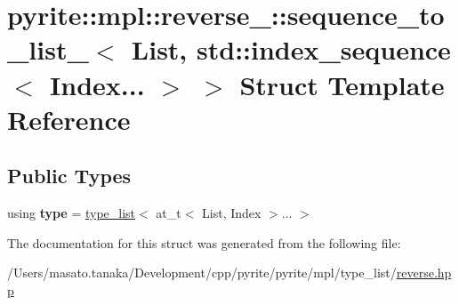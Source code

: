 \hypertarget{structpyrite_1_1mpl_1_1reverse___1_1sequence__to__list___3_01_list_00_01std_1_1index__sequence_3_01_index_8_8_8_01_4_01_4}{}\section{pyrite\+:\+:mpl\+:\+:reverse\+\_\+\+:\+:sequence\+\_\+to\+\_\+list\+\_\+$<$ List, std\+:\+:index\+\_\+sequence$<$ Index... $>$ $>$ Struct Template Reference}
\label{structpyrite_1_1mpl_1_1reverse___1_1sequence__to__list___3_01_list_00_01std_1_1index__sequence_3_01_index_8_8_8_01_4_01_4}
\subsection*{Public Types}
\begin{DoxyCompactItemize}
\item 
\mbox{\label{structpyrite_1_1mpl_1_1reverse___1_1sequence__to__list___3_01_list_00_01std_1_1index__sequence_3_01_index_8_8_8_01_4_01_4_a1340c46dbbd09b4ac3e958df00bf7bf6}} 
using {\bfseries type} = \mbox{\hyperlink{structpyrite_1_1core_1_1mpl_1_1type__list}{type\+\_\+list}}$<$ at\+\_\+t$<$ List, Index $>$... $>$
\end{DoxyCompactItemize}


The documentation for this struct was generated from the following file\+:\begin{DoxyCompactItemize}
\item 
/\+Users/masato.\+tanaka/\+Development/cpp/pyrite/pyrite/mpl/type\+\_\+list/\mbox{\hyperlink{reverse_8hpp}{reverse.\+hpp}}\end{DoxyCompactItemize}

